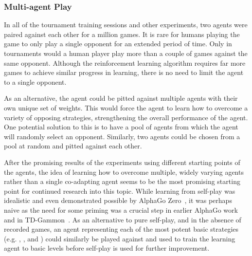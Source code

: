 
\subsubsection*{Multi-agent Play}
\label{sec:disc-future-rr}


In all of the tournament training sessions and other experiments,
two agents were paired against each other for a million games.
%
%
It is rare for humans playing the game to only play a single opponent
for an extended period of time.
%
Only in tournaments would a human player play more than a couple of games
against the same opponent.
%
Although the reinforcement learning algorithm requires far more games to
achieve similar progress in learning,
there is no need to limit the agent to a single opponent.

As an alternative,
the agent could be pitted against multiple agents with their own unique set of
weights.
%
This would force the agent to learn how to overcome a variety of opposing
strategies,
strengthening the overall performance of the agent.
%
One potential solution to this is to have a pool of agents
from which the agent will randomly select an opponent.
%
Similarly,
two agents could be chosen from a pool at random and pitted against each
other.

After the promising results of the experiments using different starting points
of the agents,
the idea of learning how to overcome multiple, widely varying agents
rather than a single co-adapting agent
seems to be the most promising starting point for continued research into this
topic.
%
While learning from self-play was idealistic
and even demonstrated possible by AlphaGo Zero~\cite{deepmind_alphago_zero},
it was perhaps naive as
the need for some priming was a crucial step in earlier AlphaGo
work~\cite{deepmind_alphago} and in TD-Gammon~\cite{tdgammon}.
%
As an alternative to pure self-play,
and in the absence of recorded games,
an agent representing each of the most potent basic strategies
(e.g. \handmaxavg, \handmaxmin, and \handmaxposs)
could similarly be played against and used to train the learning agent
to basic levels before self-play is used for further improvement.

